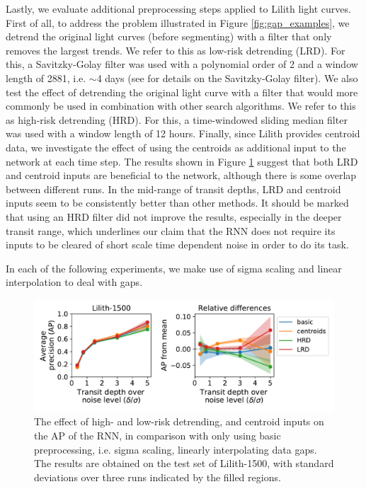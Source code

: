 Lastly, we evaluate additional preprocessing steps applied to Lilith light curves. First of all, to address the problem illustrated in Figure \ref{fig:gap_examples}, we detrend the original light curves (before segmenting) with a filter that only removes the largest trends. We refer to this as low-risk detrending (LRD). For this, a Savitzky-Golay filter was used with a polynomial order of 2 and a window length of 2881, i.e. $\sim$4 days (see \cite{hippke2019wotan} for details on the Savitzky-Golay filter). We also test the effect of detrending the original light curve with a filter that would more commonly be used in combination with other search algorithms. We refer to this as high-risk detrending (HRD). For this, a time-windowed sliding median filter was used with a window length of 12 hours. Finally, since Lilith provides centroid data, we investigate the effect of using the centroids as additional input to the network at each time step. The results shown in Figure \ref{fig:lilith_pp_advanced} suggest that both LRD and centroid inputs are beneficial to the network, although there is some overlap between different runs. In the mid-range of transit depths, LRD and centroid inputs seem to be consistently better than other methods. It should be marked that using an HRD filter did not improve the results, especially in the deeper transit range, which underlines our claim that the RNN does not require its inputs to be cleared of short scale time dependent noise in order to do its task.

In each of the following experiments, we make use of sigma scaling and linear interpolation to deal with gaps.
\begin{figure}
    \centering
    \includegraphics[width=0.7\linewidth]{Experiments/Figures/Preprocessing/lilith1500_AP_pp-advanced.pdf}
    \caption{ The effect of high- and low-risk detrending, and centroid inputs on the AP of the RNN, in comparison with only using basic preprocessing, i.e. sigma scaling, linearly interpolating data gaps. The results are obtained on the test set of Lilith-1500, with standard deviations over three runs indicated by the filled regions. }
    \label{fig:lilith_pp_advanced}
\end{figure}
